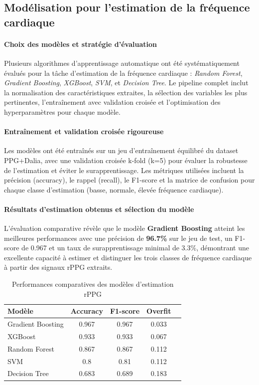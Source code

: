 \subsection{Modélisation pour l'estimation de la fréquence cardiaque}

\paragraph{Choix des modèles et stratégie d'évaluation}
Plusieurs algorithmes d'apprentissage automatique ont été systématiquement évalués pour la tâche d'estimation de la fréquence cardiaque : \textit{Random Forest}, \textit{Gradient Boosting}, \textit{XGBoost}, \textit{SVM}, et \textit{Decision Tree}. Le pipeline complet inclut la normalisation des caractéristiques extraites, la sélection des variables les plus pertinentes, l'entraînement avec validation croisée et l'optimisation des hyperparamètres pour chaque modèle.

\paragraph{Entraînement et validation croisée rigoureuse}
Les modèles ont été entraînés sur un jeu d'entraînement équilibré du dataset PPG+Dalia, avec une validation croisée k-fold (k=5) pour évaluer la robustesse de l'estimation et éviter le surapprentissage. Les métriques utilisées incluent la précision (accuracy), le rappel (recall), le F1-score et la matrice de confusion pour chaque classe d'estimation (basse, normale, élevée fréquence cardiaque).

\paragraph{Résultats d'estimation obtenus et sélection du modèle}
L'évaluation comparative révèle que le modèle \textbf{Gradient Boosting} atteint les meilleures performances avec une précision de \textbf{96.7\%} sur le jeu de test, un F1-score de 0.967 et un taux de surapprentissage minimal de 3.3\%, démontrant une excellente capacité à estimer et distinguer les trois classes de fréquence cardiaque à partir des signaux rPPG extraits.

\begin{table}[H]
    \centering
    \caption{Performances comparatives des modèles d'estimation rPPG}
    \begin{tabular}{lcccc}
        \hline
        \textbf{Modèle} & \textbf{Accuracy} & \textbf{F1-score} & \textbf{Overfit} \\
        \hline
        Gradient Boosting & 0.967 & 0.967 & 0.033 \\
        XGBoost           & 0.933 & 0.933 & 0.067 \\
        Random Forest     & 0.867 & 0.867 & 0.112 \\
        SVM               & 0.8 & 0.81 & 0.112 \\
        Decision Tree     & 0.683 & 0.689 & 0.183 \\
        \hline
    \end{tabular}
\end{table}

